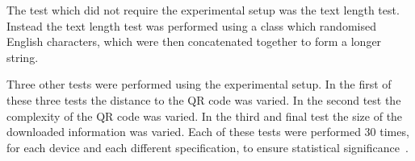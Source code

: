 The test which did not require the experimental setup was the text length test. Instead the text length test was performed using a class which randomised English characters, which were then concatenated together to form a longer string.

Three other tests were performed using the experimental setup. In the first of these three tests the distance to the QR code was varied. In the second test the complexity of the QR code was varied. In the third and final test the size of the downloaded information was varied. Each of these tests were performed 30 times, for each device and each different specification, to ensure statistical significance~\cite{30sampleSize}.
